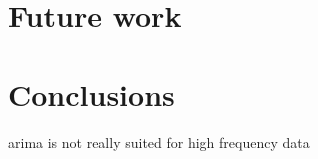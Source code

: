 \documentclass[12pt,a4paper,titlepage]{report}
\begin{document}
\section{Future work}

\section{Conclusions}

arima is not really suited for high frequency data

\newpage


\end{document}

